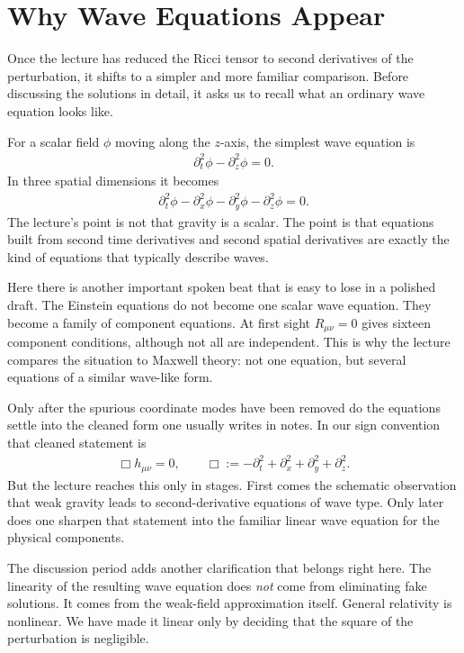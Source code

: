 \section{Why Wave Equations Appear}

Once the lecture has reduced the Ricci tensor to second derivatives of the perturbation, it shifts to a simpler and more familiar comparison. Before discussing the solutions in detail, it asks us to recall what an ordinary wave equation looks like.

For a scalar field \(\phi\) moving along the \(z\)-axis, the simplest wave equation is
\begin{align}
\partial_t^2\phi-\partial_z^2\phi=0.
\end{align}
In three spatial dimensions it becomes
\begin{align}
\partial_t^2\phi-\partial_x^2\phi-\partial_y^2\phi-\partial_z^2\phi=0.
\end{align}
The lecture's point is not that gravity is a scalar. The point is that equations built from second time derivatives and second spatial derivatives are exactly the kind of equations that typically describe waves.

Here there is another important spoken beat that is easy to lose in a polished draft. The Einstein equations do not become one scalar wave equation. They become a family of component equations. At first sight \(R_{\mu\nu}=0\) gives sixteen component conditions, although not all are independent. This is why the lecture compares the situation to Maxwell theory: not one equation, but several equations of a similar wave-like form.

Only after the spurious coordinate modes have been removed do the equations settle into the cleaned form one usually writes in notes. In our sign convention that cleaned statement is
\begin{align}
\Box h_{\mu\nu}=0,
\qquad
\Box:=-\partial_t^2+\partial_x^2+\partial_y^2+\partial_z^2.
\end{align}
But the lecture reaches this only in stages. First comes the schematic observation that weak gravity leads to second-derivative equations of wave type. Only later does one sharpen that statement into the familiar linear wave equation for the physical components.

The discussion period adds another clarification that belongs right here. The linearity of the resulting wave equation does \emph{not} come from eliminating fake solutions. It comes from the weak-field approximation itself. General relativity is nonlinear. We have made it linear only by deciding that the square of the perturbation is negligible.

